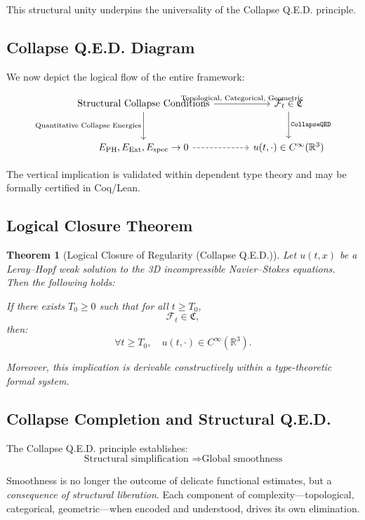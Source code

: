 \documentclass[11pt]{article}
\newtheorem{theorem}{Theorem}[section]
\begin{document}
This structural unity underpins the universality of the Collapse Q.E.D. principle.

\subsection{Collapse Q.E.D. Diagram}

We now depict the logical flow of the entire framework:

\[
\begin{tikzcd}[row sep=large, column sep=large]
\text{Structural Collapse Conditions}
  \arrow[r, "\text{Topological, Categorical, Geometric}"]
  \arrow[d, "\text{Quantitative Collapse Energies}"']
&
\mathcal{F}_t \in \mathfrak{C}
  \arrow[d, "\texttt{CollapseQED}" right]
\\
E_{\mathrm{PH}}, E_{\mathrm{Ext}}, E_{\mathrm{spec}} \to 0
  \arrow[r, dashrightarrow]
&
u(t, \cdot) \in C^\infty(\mathbb{R}^3)
\end{tikzcd}
\]

The vertical implication is validated within dependent type theory and may be formally certified in Coq/Lean.

\subsection{Logical Closure Theorem}

\begin{theorem}[Logical Closure of Regularity (Collapse Q.E.D.)]
\label{thm:logical-closure}
Let \( u(t,x) \) be a Leray--Hopf weak solution to the 3D incompressible Navier--Stokes equations. Then the following holds:

If there exists \( T_0 \geq 0 \) such that for all \( t \geq T_0 \),
\[
\mathcal{F}_t \in \mathfrak{C},
\]
then:
\[
\forall t \geq T_0,\quad u(t, \cdot) \in C^\infty(\mathbb{R}^3).
\]

Moreover, this implication is derivable constructively within a type-theoretic formal system.
\end{theorem}

\subsection{Collapse Completion and Structural Q.E.D.}

The Collapse Q.E.D. principle establishes:
\[
\boxed{
\text{Structural simplification } \Rightarrow \text{Global smoothness}
}
\]

Smoothness is no longer the outcome of delicate functional estimates, but a \emph{consequence of structural liberation}. Each component of complexity—topological, categorical, geometric—when encoded and understood, drives its own elimination.
\end{document}
